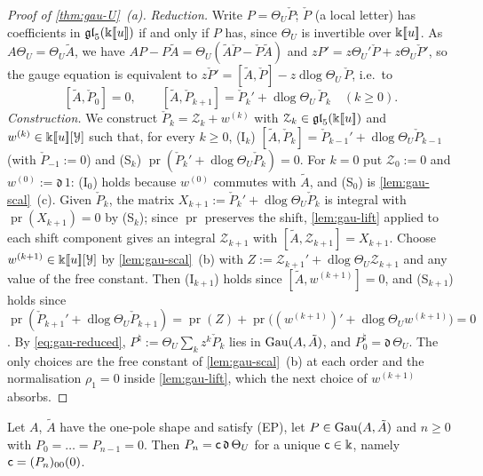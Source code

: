 \begin{proof}[Proof of \cref{thm:gau-U}~(a)]
\emph{Reduction.} Write $P=\Theta_U\check P$; $\check P$ (a local letter) has coefficients in $\mathfrak{gl}_5(\Bbbk[\![ u ]\!])$ if and only if $P$ has, since $\Theta_U$ is invertible over $\Bbbk[\![ u ]\!]$. As $A\Theta_U=\Theta_U\tilde A$, we have $AP-P\tilde A=\Theta_U(\tilde A\check P-\check P\tilde A)$ and $zP'=z\Theta_U'\check P+z\Theta_U\check P'$, so the gauge equation is equivalent to $z\check P'=[\tilde A,\check P]-z\operatorname{dlog}\Theta_U\,\check P$, i.e.\ to
\begin{equation}
\label{eq:gau-reduced}
[\tilde A,\check P_0]=0,\qquad [\tilde A,\check P_{k+1}]=\check P_k'+\operatorname{dlog}\Theta_U\,\check P_k\quad(k\geq0).
\end{equation}
\emph{Construction.} We construct $\check P_k=\mathcal Z_k+w^{(k)}$ with $\mathcal Z_k\in\mathfrak{gl}_5(\Bbbk[\![ u ]\!])$ and $w^{(k)}\in\Bbbk[\![ u ]\!][\mathcal Y]$ such that, for every $k\geq0$, (I$_k$) $[\tilde A,\check P_k]=\check P_{k-1}'+\operatorname{dlog}\Theta_U\check P_{k-1}$ (with $\check P_{-1}:=0$) and (S$_k$) $\operatorname{pr}(\check P_k'+\operatorname{dlog}\Theta_U\check P_k)=0$. For $k=0$ put $\mathcal Z_0:=0$ and $w^{(0)}:=\mathfrak d\,1$: (I$_0$) holds because $w^{(0)}$ commutes with $\tilde A$, and (S$_0$) is \cref{lem:gau-scal}~(c). Given $\check P_k$, the matrix $X_{k+1}:=\check P_k'+\operatorname{dlog}\Theta_U\check P_k$ is integral with $\operatorname{pr}(X_{k+1})=0$ by (S$_k$); since $\operatorname{pr}$ preserves the shift, \cref{lem:gau-lift} applied to each shift component gives an integral $\mathcal Z_{k+1}$ with $[\tilde A,\mathcal Z_{k+1}]=X_{k+1}$. Choose $w^{(k+1)}\in\Bbbk[\![ u ]\!][\mathcal Y]$ by \cref{lem:gau-scal}~(b) with $Z:=\mathcal Z_{k+1}'+\operatorname{dlog}\Theta_U\mathcal Z_{k+1}$ and any value of the free constant. Then (I$_{k+1}$) holds since $[\tilde A,w^{(k+1)}]=0$, and (S$_{k+1}$) holds since $\operatorname{pr}(\check P_{k+1}'+\operatorname{dlog}\Theta_U\check P_{k+1})=\operatorname{pr}(Z)+\operatorname{pr}\bigl((w^{(k+1)})'+\operatorname{dlog}\Theta_Uw^{(k+1)}\bigr)=0$. By \eqref{eq:gau-reduced}, $P^\natural:=\Theta_U\sum_kz^k\check P_k$ lies in $\operatorname{Gau}(A,\tilde A)$, and $P^\natural_0=\mathfrak d\,\Theta_U$. The only choices are the free constant of \cref{lem:gau-scal}~(b) at each order and the normalisation $\rho_1=0$ inside \cref{lem:gau-lift}, which the next choice of $w^{(k+1)}$ absorbs.
\end{proof}

\begin{lem}
\label{lem:gau-lead}
Let $A$, $\tilde A$ have the one-pole shape and satisfy (EP), let $P\in\operatorname{Gau}(A,\tilde A)$ and $n\geq0$ with $P_0=\dots=P_{n-1}=0$. Then $P_n=\mathsf{c}\,\mathfrak d\,\Theta_U$ for a unique $\mathsf{c}\in\Bbbk$, namely $\mathsf{c}=(P_n)_{00}(0)$.
\end{lem}

